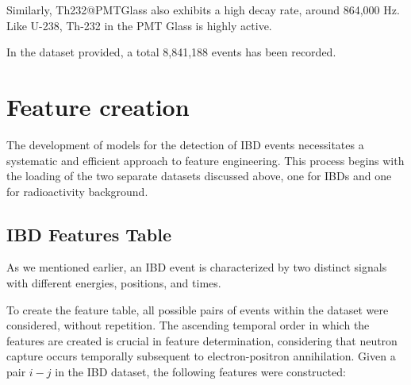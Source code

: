 Similarly, Th232@PMTGlass also exhibits a high decay rate, around 864,000 Hz. Like U-238, Th-232 in the PMT Glass is highly active. 


In the dataset provided, a total 8,841,188 events has been recorded.

\newpage

\section{Feature creation}

The development of models for the detection of IBD events necessitates a systematic and efficient approach to feature engineering. This process begins with the loading of the two separate datasets discussed above, one for IBDs and one for radioactivity background.

\subsection{IBD Features Table}
As we mentioned earlier, an IBD event is characterized by two distinct signals with different energies, positions, and times. 

To create the feature table, all possible pairs of events within the dataset were considered, without repetition. The ascending temporal order in which the features are created is crucial in feature determination, considering that neutron capture occurs temporally subsequent to electron-positron annihilation. 
Given a pair $i-j$ in the IBD dataset, the following features were constructed:


